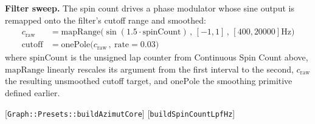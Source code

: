 \documentclass[sigconf,nonacm]{acmart}
\newcommand{\coderef}[1]{{\small [#1]}}
\begin{document}
\textbf{Filter sweep.} The spin count drives a phase modulator whose sine output is remapped onto
the filter's cutoff range and smoothed:
\begin{align*}
c_{\text{raw}} &=
\mathrm{mapRange}\big(\sin(1.5\cdot\text{spinCount})\,,\,[-1,1]\,,\,[400,20000]\text{Hz}\big) \\
\text{cutoff} &= \mathrm{onePole}\big(c_{\text{raw}}\,,\ \text{rate}{=}0.03\big)
\end{align*}
where $\text{spinCount}$ is the unsigned lap counter from Continuous Spin Count above,
$\mathrm{mapRange}$ linearly rescales its argument from the first interval to the second,
$c_{\text{raw}}$ the resulting unsmoothed cutoff target, and $\mathrm{onePole}$ the smoothing
primitive defined earlier.
\begin{flushright}
\coderef{\texttt{Graph::Presets::buildAzimutCore}}
\coderef{\texttt{buildSpinCountLpfHz}}
\end{flushright}
\end{document}
